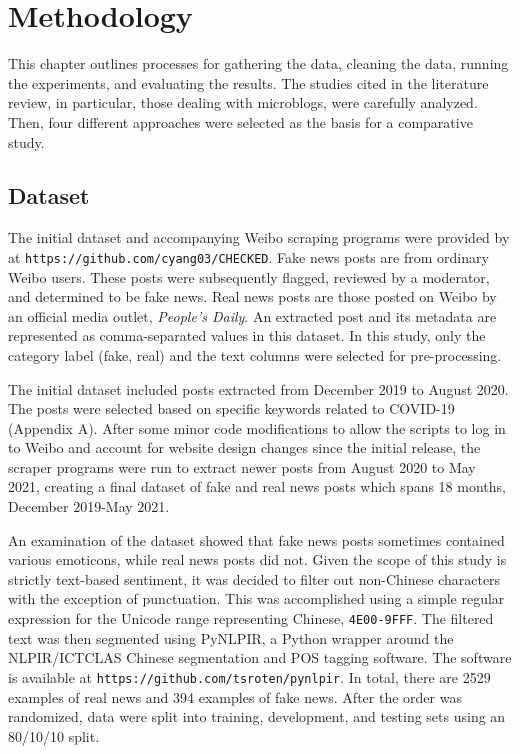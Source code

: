\documentclass [11pt, proquest] {uwthesis}[2020/02/24]
\begin{document}
\chapter{Methodology} 
This chapter outlines processes for gathering the data, cleaning the data, running the experiments, and evaluating the results. The studies cited in the literature review, in particular, those dealing with microblogs, were carefully analyzed. Then, four different approaches were selected as the basis for a comparative study.
\section{Dataset}
The initial dataset and accompanying Weibo scraping programs were provided by \cite{Yang2020} at \texttt{https://github.com/cyang03/CHECKED}. Fake news posts are from ordinary Weibo users. These posts were subsequently flagged, reviewed by a moderator, and determined to be fake news. Real news posts are those posted on Weibo by an official media outlet, \textit{People's Daily}. An extracted post and its metadata are represented as comma-separated values in this dataset. In this study, only the category label (fake, real) and the text columns were selected for pre-processing.

The initial dataset included posts extracted from December 2019 to August 2020. The posts were selected based on specific keywords related to COVID-19 (Appendix A). After some minor code modifications to allow the scripts to log in to Weibo and account for website design changes since the initial release, the scraper programs were run to extract newer posts from August 2020 to May 2021, creating a final dataset of fake and real news posts which spans 18 months, December 2019-May 2021.

An examination of the dataset showed that fake news posts sometimes contained various emoticons, while real news posts did not. Given the scope of this study is strictly text-based sentiment, it was decided to filter out non-Chinese characters with the exception of punctuation. This was accomplished using a simple regular expression for the Unicode range representing Chinese, \texttt{4E00-9FFF}. The filtered text was then segmented using PyNLPIR, a Python wrapper around the NLPIR/ICTCLAS Chinese segmentation and POS tagging software. The software is available at \texttt{https://github.com/tsroten/pynlpir}. In total, there are 2529 examples of real news and 394 examples of fake news. After the order was randomized, data were split into training, development, and testing sets using an 80/10/10 split.
\end{document}
